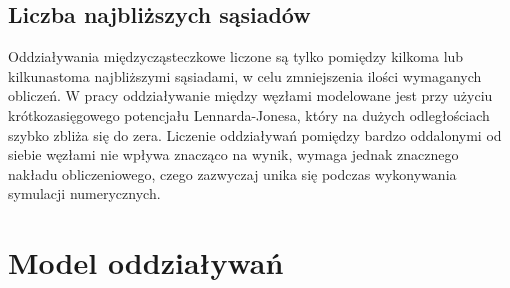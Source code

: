 \documentclass[12pt, letterpaper]{report}
\begin{document}
    \subsection{Liczba najbliższych sąsiadów}
    Oddziaływania międzycząsteczkowe liczone są tylko pomiędzy kilkoma lub kilkunastoma najbliższymi 
    sąsiadami, w celu zmniejszenia ilości wymaganych obliczeń. W pracy oddziaływanie między węzłami 
    modelowane jest przy użyciu krótkozasięgowego potencjału Lennarda-Jonesa, który na dużych 
    odległościach szybko zbliża się do zera. Liczenie oddziaływań pomiędzy bardzo oddalonymi od 
    siebie węzłami nie wpływa znacząco na wynik, wymaga jednak znacznego nakładu obliczeniowego, 
    czego zazwyczaj unika się podczas wykonywania symulacji numerycznych.


    \clearpage
    \section{Model oddziaływań}
\end{document}
